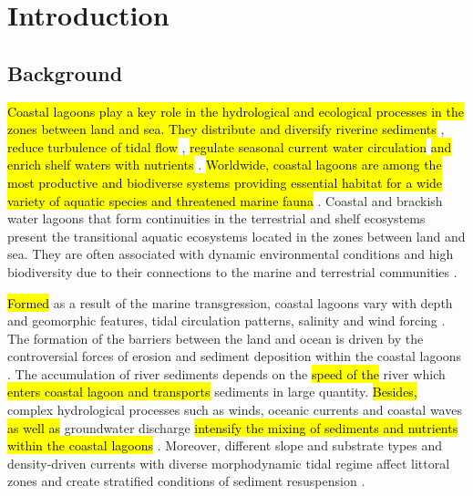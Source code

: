 \documentclass[jmse,article,submit,pdftex,moreauthors]{Definitions/mdpi}
\begin{document}
\section{Introduction}

\subsection{Background}

\hl{Coastal lagoons play a key role in the hydrological and ecological processes in the zones between land and sea. They distribute and diversify riverine sediments} \cite{AMARAL2023165264}, \hl{reduce turbulence of tidal flow} \cite{XUE2023103048}, \hl{regulate seasonal current water circulation} \cite{MAO2023102276} \hl{and enrich shelf waters with nutrients} \cite{CEBRIAN20099}. \hl{Worldwide, coastal lagoons are among the most productive and biodiverse systems providing essential habitat for a wide variety of aquatic species and threatened marine fauna} \cite{MATEOSMOLINA2024116117,ZAMORALOPEZ2023108447,MIGNUCCI2023108450}. Coastal and brackish water lagoons that form continuities in the terrestrial and shelf ecosystems present the transitional aquatic ecosystems located in the zones between land and sea. They are often associated with dynamic environmental conditions and high biodiversity due to their connections to the marine and terrestrial communities \cite{PEREZRUZAFA2019253}. 

\hl{Formed} as a result of the marine transgression, coastal lagoons vary with depth and geomorphic features, tidal circulation patterns, salinity and wind forcing \cite{KJERFVE198663}. The formation of the barriers between the land and ocean is driven by the controversial forces of erosion and sediment deposition within the coastal lagoons \cite{BOYD1992139}. The accumulation of river sediments depends on the \hl{speed of the }river which \hl{enters coastal lagoon and transports} sediments in large quantity. \hl{Besides, }complex hydrological processes such as winds, oceanic currents and coastal waves \hl{as well as }groundwater discharge \cite{DANISH2020103816}\hl{ intensify the mixing of sediments and nutrients within the coastal lagoons }\cite{KUMAR2016155}. Moreover, different slope and substrate types and density-driven currents with diverse morphodynamic tidal regime affect littoral zones\hl{ }and create stratified conditions of\hl{ }sediment resuspension \cite{BORTOLIN2020105782,Larson2012}. 
\end{document}
